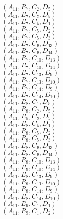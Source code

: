 \documentclass[14pt]{article}
\begin{document}
    $({A}_{11}, {B}_{7}, {C}_{2}, {D}_{5}) $ \\ 
    $({A}_{11}, {B}_{7}, {C}_{3}, {D}_{5}) $ \\ 
    $({A}_{11}, {B}_{7}, {C}_{5}, {D}_{1}) $ \\ 
    $({A}_{11}, {B}_{7}, {C}_{5}, {D}_{2}) $ \\ 
    $({A}_{11}, {B}_{7}, {C}_{5}, {D}_{3}) $ \\ 
    $({A}_{11}, {B}_{7}, {C}_{9}, {D}_{13}) $ \\ 
    $({A}_{11}, {B}_{7}, {C}_{9}, {D}_{14}) $ \\ 
    $({A}_{11}, {B}_{7}, {C}_{10}, {D}_{13}) $ \\ 
    $({A}_{11}, {B}_{7}, {C}_{10}, {D}_{14}) $ \\ 
    $({A}_{11}, {B}_{7}, {C}_{13}, {D}_{9}) $ \\ 
    $({A}_{11}, {B}_{7}, {C}_{13}, {D}_{10}) $ \\ 
    $({A}_{11}, {B}_{7}, {C}_{14}, {D}_{9}) $ \\ 
    $({A}_{11}, {B}_{7}, {C}_{14}, {D}_{10}) $ \\ 
    $({A}_{11}, {B}_{8}, {C}_{1}, {D}_{5}) $ \\ 
    $({A}_{11}, {B}_{8}, {C}_{2}, {D}_{5}) $ \\ 
    $({A}_{11}, {B}_{8}, {C}_{3}, {D}_{5}) $ \\ 
    $({A}_{11}, {B}_{8}, {C}_{5}, {D}_{1}) $ \\ 
    $({A}_{11}, {B}_{8}, {C}_{5}, {D}_{2}) $ \\ 
    $({A}_{11}, {B}_{8}, {C}_{5}, {D}_{3}) $ \\ 
    $({A}_{11}, {B}_{8}, {C}_{9}, {D}_{13}) $ \\ 
    $({A}_{11}, {B}_{8}, {C}_{9}, {D}_{14}) $ \\ 
    $({A}_{11}, {B}_{8}, {C}_{10}, {D}_{13}) $ \\ 
    $({A}_{11}, {B}_{8}, {C}_{10}, {D}_{14}) $ \\ 
    $({A}_{11}, {B}_{8}, {C}_{13}, {D}_{9}) $ \\ 
    $({A}_{11}, {B}_{8}, {C}_{13}, {D}_{10}) $ \\ 
    $({A}_{11}, {B}_{8}, {C}_{14}, {D}_{9}) $ \\ 
    $({A}_{11}, {B}_{8}, {C}_{14}, {D}_{10}) $ \\ 
    $({A}_{11}, {B}_{9}, {C}_{1}, {D}_{1}) $ \\ 
    $({A}_{11}, {B}_{9}, {C}_{1}, {D}_{2}) $ \\ 
\end{document}
